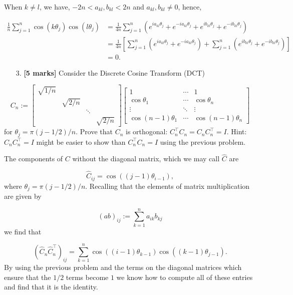 \documentclass[12pt,a4paper]{article}
\begin{document}
When $k \neq l$, we have, $-2n < a_{kl}, b_{kl} <  2n$ and $a_{kl}, b_{kl} \neq 0$, hence,


\begin{align*}
	\frac{1}{n}\sum_{j=1}^n \cos(k\theta_j)\cos(l\theta_j) &= \frac{1}{4n}\sum_{j=1}^n (e^{ia_{kl}\theta_j} + e^{-ia_{kl}\theta_j} + e^{ib_{kl}\theta_j} + e^{-ib_{kl}\theta_j}) \\
	&= \frac{1}{4n} \left[\sum_{j=1}^n (e^{ia_{kl}\theta_j} + e^{-ia_{kl}\theta_j})  + \sum_{j=1}^n (e^{ib_{kl}\theta_j} + e^{-ib_{kl}\theta_j} )\right] \\
	&= 0.
\end{align*}
\begin{itemize}
\item[3. ] \textbf{[5 marks]} Consider the Discrete Cosine Transform (DCT)

\end{itemize}
\[
C_n := \begin{bmatrix}
\sqrt{1/n} \\
 & \sqrt{2/n} \\ 
 && \ddots \\
 &&& \sqrt{2/n}
 \end{bmatrix}
\begin{bmatrix}
    1 & \cdots & 1\\
    \cos \theta_1 & \cdots & \cos \theta_n \\
    \vdots & \ddots & \vdots \\
    \cos (n-1)\theta_1 & \cdots & \cos (n-1)\theta_n
\end{bmatrix}
\]
for $\theta_j = \pi(j-1/2)/n$. Prove that $C_n$ is orthogonal: $C_n^{\top} C_n = C_n C_n^{\top} = I$. Hint: $C_n C_n^{\top} = I$ might be easier to show than $C_n^{\top} C_n = I$ using the previous problem.

The components of $C$ without the diagonal matrix, which we may call $\hat{C}$ are

\[
\hat{C}_{ij} = \cos((j-1)\ensuremath{\theta}_{i-1}),
\]
where $\ensuremath{\theta}_j = \ensuremath{\pi}(j-1/2)/n$. Recalling that the elements of matrix multiplication are given by

\[
(ab)_{ij} := \sum_{k=1}^n a_{ik} b_{kj}
\]
we find that

\[
(\hat{C}_n \hat{C}_n^\ensuremath{\top})_{ij} = \sum_{k=1}^n \cos((i-1)\ensuremath{\theta}_{k-1}) \cos((k-1)\ensuremath{\theta}_{j-1}).
\]
By using the previous problem and the terms on the diagonal matrices which ensure that the $1/2$ terms become $1$ we know how to compute all of these entries and find that it is the identity.
\end{document}
